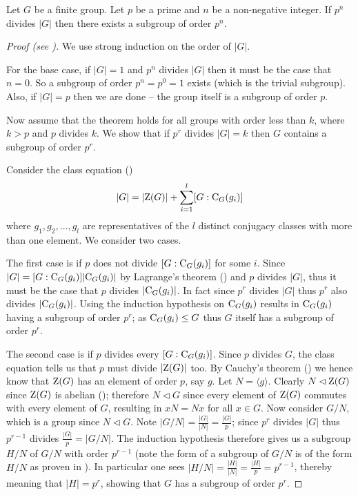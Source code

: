 \begin{theorem}[Sylow I]\label{thrm-sylow-1}
    Let $G$ be a finite group. Let $p$ be a prime and $n$ be a non-negative integer. If $p^n$ divides $|G|$ then there exists a subgroup of order $p^n$.
\end{theorem}
\begin{proof}[Proof (see {\cite[Theorem 15.4]{judson_beezer_2022}})]
    We use strong induction on the order of $|G|$.

    For the base case, if $|G| = 1$ and $p^n$ divides $|G|$ then it must be the case that $n = 0$. So a subgroup of order $p^n = p^0 = 1$ exists (which is the trivial subgroup). Also, if $|G| = p$ then we are done -- the group itself is a subgroup of order $p$.

    Now assume that the theorem holds for all groups with order less than $k$, where $k > p$ and $p$ divides $k$. We show that if $p^r$ divides $|G| = k$ then $G$ contains a subgroup of order $p^r$.

    Consider the class equation ()
    \[
        |G| = |\mathrm{Z}(G)| + \sum_{i=1}^l [G:\mathrm{C}_{G}(g_i)]
    \]
    where $g_1, g_2, \dots, g_l$ are representatives of the $l$ distinct conjugacy classes with more than one element. We consider two cases.

    The first case is if $p$ does not divide $[G:\mathrm{C}_{G}(g_i)]$ for some $i$. Since $|G| = [G:\mathrm{C}_{G}(g_i)]|\mathrm{C}_{G}(g_i)|$ by Lagrange's theorem () and $p$ divides $|G|$, thus it must be the case that $p$ divides $|\mathrm{C}_{G}(g_i)|$. In fact since $p^r$ divides $|G|$ thus $p^r$ also divides $|\mathrm{C}_{G}(g_i)|$. Using the induction hypothesis on $\mathrm{C}_{G}(g_i)$ results in $\mathrm{C}_{G}(g_i)$ having a subgroup of order $p^r$; as $\mathrm{C}_{G}(g_i) \leq G$ thus $G$ itself has a subgroup of order $p^r$.

    The second case is if $p$ divides every $[G:\mathrm{C}_{G}(g_i)]$. Since $p$ divides $G$, the class equation tells us that $p$ must divide $|\mathrm{Z}(G)|$ too. By Cauchy's theorem () we hence know that $\mathrm{Z}(G)$ has an element of order $p$, say $g$. Let $N = \langle g \rangle$. Clearly $N \lhd \mathrm{Z}(G)$ since $\mathrm{Z}(G)$ is abelian (); therefore $N \lhd G$ since every element of $\mathrm{Z}(G)$ commutes with every element of $G$, resulting in $xN = Nx$ for all $x \in G$. Now consider $G/N$, which is a group since $N \lhd G$. Note $|G/N| = \frac{|G|}{|N|} = \frac{|G|}{p}$; since $p^r$ divides $|G|$ thus $p^{r-1}$ divides $\frac{|G|}{p} = |G/N|$. The induction hypothesis therefore gives us a subgroup $H/N$ of $G/N$ with order $p^{r-1}$ (note the form of a subgroup of $G/N$ is of the form $H/N$ as proven in ). In particular one sees $|H/N| = \frac{|H|}{|N|} = \frac{|H|}{p} = p^{r-1}$, thereby meaning that $|H| = p^r$, showing that $G$ has a subgroup of order $p^r$.
\end{proof}

